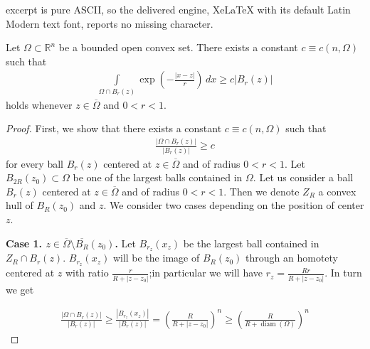 \documentclass[10pt,a4paper]{amsart}
\DeclareMathOperator{\diam}{diam}
\newcommand{\I}{\int\limits}
\newcommand{\R}{\mathbb{R}}
\begin{document}
excerpt is pure ASCII, so the delivered engine, XeLaTeX with its default Latin Modern text font, reports no missing character.
\begin{prop}
    \label{prop:convex}
    Let $\Omega\subset \R^{n}$ be a bounded open convex set. There exists a constant $c\equiv c(n,\Omega)$ such that 
    \begin{align*}
        \I_{\Omega\cap B_{r}(z)}\exp\left( -\frac{|x-z|}{r} \right)\,dx 
        \geqslant
        c|B_{r}(z)|
    \end{align*}
    holds whenever $z\in\overline{\Omega}$ and $0<r<1$.
\end{prop}

\begin{proof}
    First, we show that there exists a constant $c\equiv c(n,\Omega)$ such that 
    \begin{align}
        \label{convex:1}
        \frac{|\Omega\cap B_{r}(z)|}{|B_{r}(z)|} \geqslant c
    \end{align}
    for every ball $B_{r}(z)$ centered at $z\in \overline{\Omega}$ and of radius $0<r<1$. Let $B_{2R}(z_0)\subset \Omega$ be one of the largest balls contained in $\Omega$.  Let us consider a ball $B_{r}(z)$ centered at $z\in \overline{\Omega}$ and of radius $0<r<1$. Then we denote $Z_{R}$ a convex hull of $B_{R}(z_0)$ and $z$. We consider two cases depending on the position of center $z$.  

    \textbf{Case 1. $z\in \overline{\Omega}\setminus \overline{B_{R}}(z_0)$.} Let $B_{r_{z}}(x_{z})$ be the largest ball contained in $Z_{R}\cap B_{r}(z)$. $B_{r_z}(x_z)$ will be the image of $B_R(z_0)$ through an homotety centered at $z$ with ratio $\frac{r}{R+|z-z_0|}$;in particular we will have $r_z=\frac{ Rr}{R+|z-z_0|}$. In turn we get

     \begin{align*}
        \frac{|\Omega\cap B_{r}(z)|}{|B_{r}(z)|}
        \geqslant
        \frac{|B_{r_{z}}(x_{z})|}{|B_{r}(z)|}
        =
        \left( \frac{R}{R + |z-z_0|} \right)^{n}
        \geqslant 
         \left( \frac{R}{R + \diam(\Omega)} \right)^{n}
    \end{align*}


\end{proof}
\end{document}

